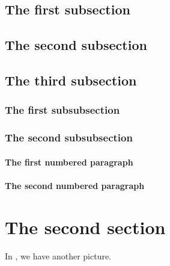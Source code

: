 \blah

\subsection{The first subsection}

\blah

\subsection{The second subsection}

\blah

\subsection{The third subsection}

\blah

\subsubsection{The first subsubsection}

\blah

\subsubsection{The second subsubsection}

\blah

\paragraph{The first numbered paragraph}

\blah

\paragraph{The second numbered paragraph}

\blah

\section{The second section}

\blah

\blah

\blah

\blah

In , we have another picture.

\blah


